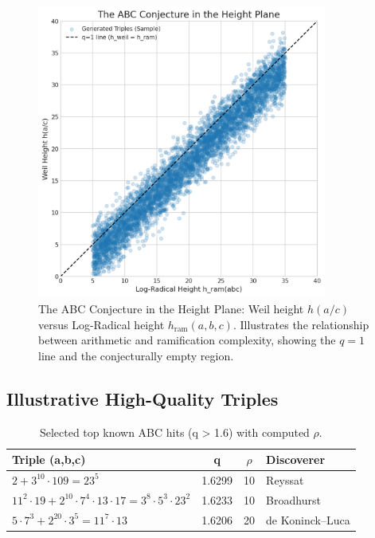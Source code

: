 \documentclass[11pt,a4paper]{article}
\begin{document}
\begin{figure}[h!]
    \centering
    \includegraphics[width=0.85\textwidth]{../figures/height_plane.png}
    \caption{The ABC Conjecture in the Height Plane: Weil height $h(a/c)$ versus Log-Radical height $h_{\mathrm{ram}}(a,b,c)$. Illustrates the relationship between arithmetic and ramification complexity, showing the $q=1$ line and the conjecturally empty region.}
    \label{fig:height_plane_viz}
\end{figure}

\subsection{Illustrative High-Quality Triples}
\begin{table}[h!]
\centering
\caption{Selected top known ABC hits (q > 1.6) with computed $\rho$.}
\begin{tabular}{l c c l}
\toprule
Triple (a,b,c) & q & $\rho$ & Discoverer \\
\midrule
$2 + 3^{10}\cdot 109 = 23^5$ & 1.6299 & 10 & Reyssat \\
$11^2\cdot 19 + 2^{10}\cdot7^4\cdot13\cdot17 = 3^8\cdot5^3\cdot23^2$ & 1.6233 & 10 & Broadhurst \\
$5\cdot7^3 + 2^{20}\cdot3^5 = 11^7\cdot13$ & 1.6206 & 20 & de Koninck--Luca \\
\bottomrule
\end{tabular}
\label{tab:top-hits}
\end{table}
\end{document}
